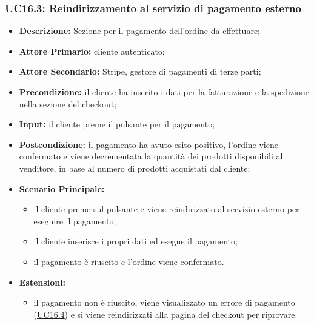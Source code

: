             \subsubsection{UC16.3: Reindirizzamento al servizio di pagamento esterno}
            \label{sec:UC16.3}
                \begin{itemize}
                    \item \textbf{Descrizione:} Sezione per il pagamento dell'ordine da effettuare;
                    \item \textbf{Attore Primario:} cliente autenticato;
                    \item \textbf{Attore Secondario:} Stripe, gestore di pagamenti di terze parti;
                    \item \textbf{Precondizione:} il cliente ha inserito i dati per la fatturazione e la spedizione nella sezione del checkout;
                    \item \textbf{Input:} il cliente preme il pulsante per il pagamento;
                    \item \textbf{Postcondizione:} il pagamento ha avuto esito positivo, l'ordine viene confermato e viene decrementata la quantità dei prodotti disponibili al venditore, in base al numero di prodotti acquistati dal cliente;
                    \item \textbf{Scenario Principale:}
                    \begin{itemize}
                        \item il cliente preme sul pulsante e viene reindirizzato al servizio esterno per eseguire il pagamento;
                        \item il cliente inserisce i propri dati ed esegue il pagamento;
                        \item il pagamento è riuscito e l'ordine viene confermato.
                    \end{itemize}
                    \item \textbf{Estensioni:}
                    \begin{itemize}
                        \item il pagamento non è riuscito, viene visualizzato un errore di pagamento (\hyperref[sec:UC16.4]{\underline{UC16.4}}) e si viene reindirizzati alla pagina del checkout per riprovare.
                    \end{itemize}
                \end{itemize}

